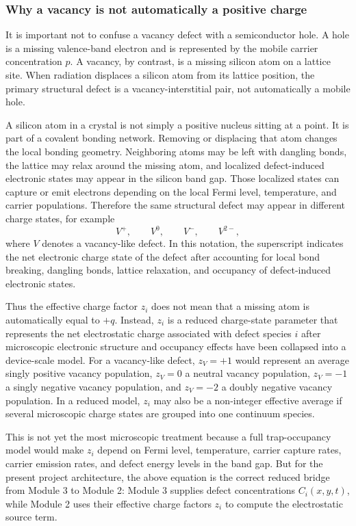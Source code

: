 \documentclass[11pt]{article}
\begin{document}
\subsubsection{Why a vacancy is not automatically a positive charge}

It is important not to confuse a vacancy defect with a semiconductor hole. A hole is a missing valence-band electron and is represented by the mobile carrier concentration $p$. A vacancy, by contrast, is a missing silicon atom on a lattice site. When radiation displaces a silicon atom from its lattice position, the primary structural defect is a vacancy-interstitial pair, not automatically a mobile hole.

A silicon atom in a crystal is not simply a positive nucleus sitting at a point. It is part of a covalent bonding network. Removing or displacing that atom changes the local bonding geometry. Neighboring atoms may be left with dangling bonds, the lattice may relax around the missing atom, and localized defect-induced electronic states may appear in the silicon band gap. Those localized states can capture or emit electrons depending on the local Fermi level, temperature, and carrier populations. Therefore the same structural defect may appear in different charge states, for example
\begin{equation}
V^+, \qquad V^0, \qquad V^-, \qquad V^{2-},
\end{equation}
where $V$ denotes a vacancy-like defect. In this notation, the superscript indicates the net electronic charge state of the defect after accounting for local bond breaking, dangling bonds, lattice relaxation, and occupancy of defect-induced electronic states.

Thus the effective charge factor $z_i$ does not mean that a missing atom is automatically equal to $+q$. Instead, $z_i$ is a reduced charge-state parameter that represents the net electrostatic charge associated with defect species $i$ after microscopic electronic structure and occupancy effects have been collapsed into a device-scale model. For a vacancy-like defect, $z_V=+1$ would represent an average singly positive vacancy population, $z_V=0$ a neutral vacancy population, $z_V=-1$ a singly negative vacancy population, and $z_V=-2$ a doubly negative vacancy population. In a reduced model, $z_i$ may also be a non-integer effective average if several microscopic charge states are grouped into one continuum species.

This is not yet the most microscopic treatment because a full trap-occupancy model would make $z_i$ depend on Fermi level, temperature, carrier capture rates, carrier emission rates, and defect energy levels in the band gap. But for the present project architecture, the above equation is the correct reduced bridge from Module 3 to Module 2: Module 3 supplies defect concentrations $C_i(x,y,t)$, while Module 2 uses their effective charge factors $z_i$ to compute the electrostatic source term.
\end{document}
